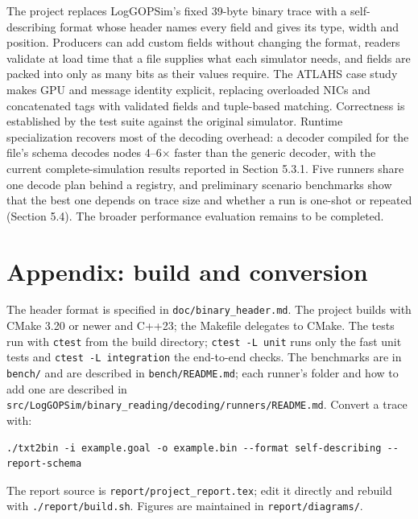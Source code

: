 \documentclass[10pt,a4paper]{article}
\begin{document}
The project replaces LogGOPSim's fixed 39-byte binary trace with a self-describing format whose header names every field and gives its type, width and position. Producers can add custom fields without changing the format, readers validate at load time that a file supplies what each simulator needs, and fields are packed into only as many bits as their values require. The ATLAHS case study makes GPU and message identity explicit, replacing overloaded NICs and concatenated tags with validated fields and tuple-based matching. Correctness is established by the test suite against the original simulator. Runtime specialization recovers most of the decoding overhead: a decoder compiled for the file's schema decodes nodes 4--6\(\times\) faster than the generic decoder, with the current complete-simulation results reported in Section 5.3.1. Five runners share one decode plan behind a registry, and preliminary scenario benchmarks show that the best one depends on trace size and whether a run is one-shot or repeated (Section 5.4). The broader performance evaluation remains to be completed.

\hypertarget{appendix-build-and-conversion}{}
\section{Appendix: build and conversion}

The header format is specified in \texttt{doc/\allowbreak{}binary\_\allowbreak{}header.\allowbreak{}md}. The project builds with CMake 3.20 or newer and C++23; the Makefile delegates to CMake. The tests run with \texttt{ctest} from the build directory; \texttt{ctest -\allowbreak{}L unit} runs only the fast unit tests and \texttt{ctest -\allowbreak{}L integratio\allowbreak{}n} the end-to-end checks. The benchmarks are in \texttt{bench/} and are described in \texttt{bench/\allowbreak{}README.\allowbreak{}md}; each runner's folder and how to add one are described in \texttt{src/\allowbreak{}LogGOPSim/\allowbreak{}binary\_\allowbreak{}reading/\allowbreak{}decoding/\allowbreak{}runners/\allowbreak{}README.\allowbreak{}md}. Convert a trace with:

\begin{lstlisting}
./txt2bin -i example.goal -o example.bin --format self-describing --report-schema
\end{lstlisting}

The report source is \texttt{report/project\_report.tex}; edit it directly and rebuild with \texttt{./report/build.sh}. Figures are maintained in \texttt{report/diagrams/}.
\end{document}
